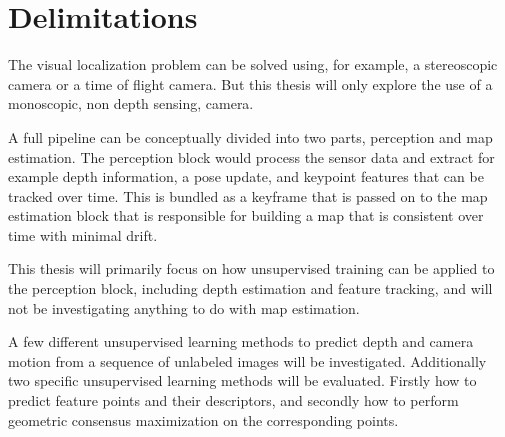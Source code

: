 \section{Delimitations}

The visual localization problem can be solved using, for example, a stereoscopic camera or a time of flight camera. But this thesis will only explore the use of a monoscopic, non depth sensing, \abbrRGB camera.

A full \abbrSFM pipeline can be conceptually divided into two parts, perception and map estimation. The perception block would process the sensor data and extract for example depth information, a pose update, and keypoint features that can be tracked over time. This is bundled as a keyframe that is passed on to the map estimation block that is responsible for building a map that is consistent over time with minimal drift\cite{orbslam}.

This thesis will primarily focus on how unsupervised training can be applied to the perception block, including depth estimation and feature tracking, and will not be investigating anything to do with map estimation.

A few different unsupervised learning methods to predict depth and camera motion from a sequence of unlabeled images will be investigated. Additionally two specific unsupervised learning methods will be evaluated. Firstly how to predict feature points and their descriptors, and secondly how to perform geometric consensus maximization on the corresponding points.